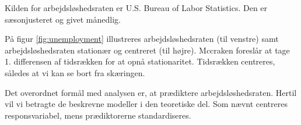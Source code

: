 Kilden for arbejdsløshedsraten er U.S. Bureau of Labor Statistics.
Den er sæsonjusteret og givet månedlig.

På figur \ref{fig:unemployment} illustreres arbejdsløshedsraten (til venstre) samt arbejdsløshedsraten stationær og centreret (til højre).
Mccraken foreslår at tage 1. differensen af tidsrækken for at opnå stationaritet.
Tidsrækken centreres, således at vi kan se bort fra skæringen.
%

Det overordnet formål med analysen er, at prædiktere arbejdsløshedsraten.
Hertil vil vi betragte de beskrevne modeller i den teoretiske del.
Som nævnt centreres responsvariabel, mens prædiktorerne standardiseres.